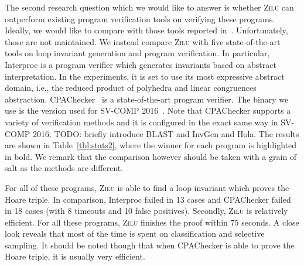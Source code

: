 The second research question which we would like to answer is whether \textsc{Zilu} can outperform existing program verification tools on verifying these programs. Ideally, we would like to compare with those tools reported in~\cite{sharma2012interpolants,sharma2013verification,DBLP:conf/esop/0001GHALN13,sharma2014invariant}. Unfortunately, those are not maintained. We instead compare \textsc{Zilu} with five state-of-the-art tools on loop invariant generation and program verification. In particular, Interproc is a program verifier which generates invariants based on abstract interpretation. In the experiments, it is set to use its most expressive abstract domain, i.e., the reduced product of polyhedra and linear congruences abstraction. CPAChecker~\cite{DBLP:conf/cav/BeyerK11} is a state-of-the-art program verifier. The binary we use is the version used for SV-COMP 2016~\cite{Dirk:SVCOMP:2016}. Note that CPAChecker supports a variety of verification methods and it is configured in the exact same way in SV-COMP 2016. TODO: briefly introduce BLAST and InvGen and Hola.
The results are shown in Table~\ref{tbl:stats2}, where the winner for each program is highlighted in bold. We remark that the comparison however should be taken with a grain of salt as the methods are different.

For all of these programs, \textsc{Zilu} is able to find a loop invariant which proves the Hoare triple. In comparison, Interproc failed in 13 cases and CPAChecker failed in 18 cases (with 8 timeouts and 10 false positives). Secondly, \textsc{Zilu} is relatively efficient. For all these programs, \textsc{Zilu} finishes the proof within 75 seconds. A close look reveals that most of the time is spent on classification and selective sampling. It should be noted though that when CPAChecker is able to prove the Hoare triple, it is usually very efficient.
